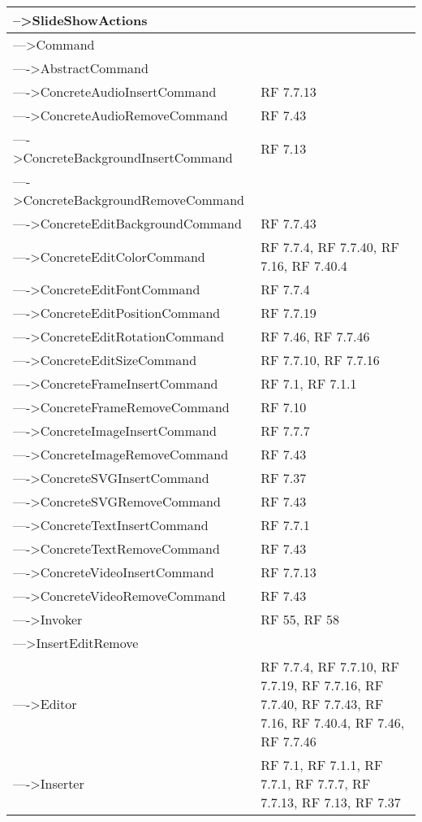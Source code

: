 {\begin{longtable} [c]{| p{8cm} | p{5cm} |}
 \hline 
-->SlideShowActions & \\ 
 \hline 
--->Command & \\ 
 \hline 
---->AbstractCommand & \\ 
 \hline 
---->ConcreteAudioInsertCommand & RF 7.7.13\\ 
 \hline 
---->ConcreteAudioRemoveCommand & RF 7.43\\ 
 \hline 
---->ConcreteBackgroundInsertCommand & RF 7.13\\ 
 \hline 
---->ConcreteBackgroundRemoveCommand & \\ 
 \hline 
---->ConcreteEditBackgroundCommand & RF 7.7.43\\ 
 \hline 
---->ConcreteEditColorCommand & RF 7.7.4, RF 7.7.40, RF 7.16, RF 7.40.4\\ 
 \hline 
---->ConcreteEditFontCommand & RF 7.7.4\\ 
 \hline 
---->ConcreteEditPositionCommand & RF 7.7.19\\ 
 \hline 
---->ConcreteEditRotationCommand & RF 7.46, RF 7.7.46\\ 
 \hline 
---->ConcreteEditSizeCommand & RF 7.7.10, RF 7.7.16\\ 
 \hline 
---->ConcreteFrameInsertCommand & RF 7.1, RF 7.1.1\\ 
 \hline 
---->ConcreteFrameRemoveCommand & RF 7.10\\ 
 \hline 
---->ConcreteImageInsertCommand & RF 7.7.7\\ 
 \hline 
---->ConcreteImageRemoveCommand & RF 7.43\\ 
 \hline 
---->ConcreteSVGInsertCommand & RF 7.37\\ 
 \hline 
---->ConcreteSVGRemoveCommand & RF 7.43\\ 
 \hline 
---->ConcreteTextInsertCommand & RF 7.7.1\\ 
 \hline 
---->ConcreteTextRemoveCommand & RF 7.43\\ 
 \hline 
---->ConcreteVideoInsertCommand & RF 7.7.13\\ 
 \hline 
---->ConcreteVideoRemoveCommand & RF 7.43\\ 
 \hline 
---->Invoker & RF 55, RF 58\\ 
 \hline 
--->InsertEditRemove & \\ 
 \hline 
---->Editor & RF 7.7.4, RF 7.7.10, RF 7.7.19, RF 7.7.16, RF 7.7.40, RF 7.7.43, RF 7.16, RF 7.40.4, RF 7.46, RF 7.7.46\\ 
 \hline 
---->Inserter & RF 7.1, RF 7.1.1, RF 7.7.1, RF 7.7.7, RF 7.7.13, RF 7.13, RF 7.37\\ 

\end{longtable}}

